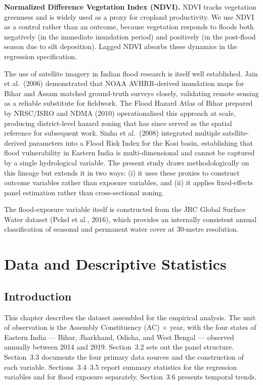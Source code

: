 \documentclass[12pt,a4paper,oneside]{report}
\begin{document}
\textbf{Normalized Difference Vegetation Index (NDVI).} NDVI tracks vegetation greenness and is widely used as a proxy for cropland productivity. We use NDVI as a control rather than an outcome, because vegetation responds to floods both negatively (in the immediate inundation period) and positively (in the post-flood season due to silt deposition). Lagged NDVI absorbs these dynamics in the regression specification.

The use of satellite imagery in Indian flood research is itself well established. Jain et al.\ (2006) demonstrated that NOAA AVHRR-derived inundation maps for Bihar and Assam matched ground-truth surveys closely, validating remote sensing as a reliable substitute for fieldwork. The Flood Hazard Atlas of Bihar prepared by NRSC/ISRO and NDMA (2010) operationalised this approach at scale, producing district-level hazard zoning that has since served as the spatial reference for subsequent work. Sinha et al.\ (2008) integrated multiple satellite-derived parameters into a Flood Risk Index for the Kosi basin, establishing that flood vulnerability in Eastern India is multi-dimensional and cannot be captured by a single hydrological variable. The present study draws methodologically on this lineage but extends it in two ways: (i) it uses these proxies to construct outcome variables rather than exposure variables, and (ii) it applies fixed-effects panel estimation rather than cross-sectional zoning.

The flood-exposure variable itself is constructed from the JRC Global Surface Water dataset (Pekel et al., 2016), which provides an internally consistent annual classification of seasonal and permanent water cover at 30-metre resolution.

\chapter{Data and Descriptive Statistics}

\section{Introduction}
This chapter describes the dataset assembled for the empirical analysis. The unit of observation is the Assembly Constituency (AC) $\times$ year, with the four states of Eastern India --- Bihar, Jharkhand, Odisha, and West Bengal --- observed annually between 2014 and 2019. Section~3.2 sets out the panel structure. Section~3.3 documents the four primary data sources and the construction of each variable. Sections~3.4--3.5 report summary statistics for the regression variables and for flood exposure separately. Section~3.6 presents temporal trends.
\end{document}
